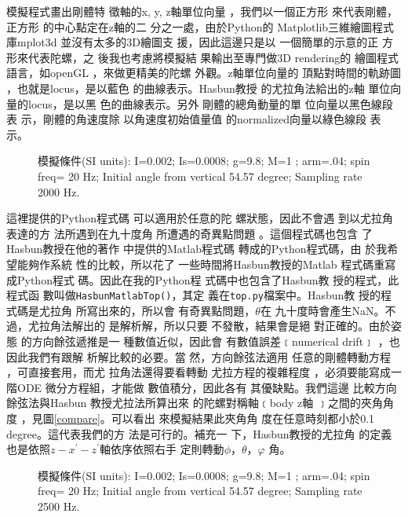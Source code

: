 \documentclass[12pt,twoside]{article}
\begin{document}
模擬程式畫出剛體特%
徵軸的x, y, z軸單位向量%
，我們以一個正方形%
來代表剛體，正方形%
的中心點定在z軸的二%
分之一處，由於Python的%
Matplotlib三維繪圖程式庫mplot3d%
並沒有太多的3D繪圖支%
援，因此這邊只是以%
一個簡單的示意的正%
方形來代表陀螺，之%
後我也考慮將模擬結%
果輸出至專門做3D rendering的%
繪圖程式語言，如openGL%
，來做更精美的陀螺%
外觀。z軸單位向量的%
頂點對時間的軌跡圖%
，也就是locus，是以藍色%
的曲線表示。Hasbun教授%
的尤拉角法給出的z軸%
單位向量的locus，是以黑%
色的曲線表示。另外%
剛體的總角動量的單%
位向量以黑色線段表%
示，剛體的角速度除%
以角速度初始值量值%
的normalized向量以綠色線段%
表示。

\begin{figure}[th]
\caption{{}模擬條件(SI units): I=0.002; Is=0.0008;
g=9.8; M=1 ; arm=.04; spin freq= 20 Hz; Initial angle from vertical 54.57
degree; Sampling rate 2000 Hz.}
\begin{center}
\fbox{}
\end{center}
\end{figure}

這裡提供的Python程式碼%
可以適用於任意的陀%
螺狀態，因此不會遇%
到以尤拉角表達的方%
法所遇到在九十度角%
所遭遇的奇異點問題%
。這個程式碼也包含%
了Hasbun教授在他的著作%
中\cite{hasbun}提供的Matlab程式碼%
轉成的Python程式碼，由%
於我希望能夠作系統%
性的比較，所以花了%
一些時間將Hasbun教授的Matlab%
程式碼重寫成Python程式%
碼。因此在我的Python程%
式碼中也包含了Hasbun教%
授的程式，此程式函%
數叫做\texttt{HasbunMatlabTop()}，其定%
義在\texttt{top.py}檔案中。Hasbun教%
授的程式碼是尤拉角%
所寫出來的，所以會%
有奇異點問題，$\theta $在%
九十度時會產生NaN。不%
過，尤拉角法解出的%
是解析解，所以只要%
不發散，結果會是絕%
對正確的。由於姿態%
的方向餘弦遞推是一%
種數值近似，因此會%
有數值誤差﹝numerical drift﹞%
，也因此我們有跟解%
析解比較的必要。當%
然，方向餘弦法適用%
任意的剛體轉動方程%
，可直接套用，而尤%
拉角法還得要看轉動%
尤拉方程的複雜程度%
，必須要能寫成一階ODE%
微分方程組，才能做%
數值積分，因此各有%
其優缺點。我們這邊%
比較方向餘弦法與Hasbun%
教授尤拉法所算出來%
的陀螺對稱軸﹝body z軸%
﹞之間的夾角角度\thinspace 
，見圖\ref{compare}。可以看出%
來模擬結果此夾角角%
度在任意時刻都小於0.1
degree。這代表我們的方%
法是可行的。補充一%
下，Hasbun教授的尤拉角%
的定義也是依照$z-x^{\prime
}-z^{\prime }$軸依序依照右手%
定則轉動$\phi $，$\theta $，$\varphi $%
角。 
\begin{figure}[th]
\caption{{}模擬條件(SI units): I=0.002; Is=0.0008;
g=9.8; M=1 ; arm=.04; spin freq= 20 Hz; Initial angle from vertical 54.57
degree; Sampling rate 2500 Hz.}
\begin{center}
\fbox{}
\end{center}
\end{figure}
\end{document}
